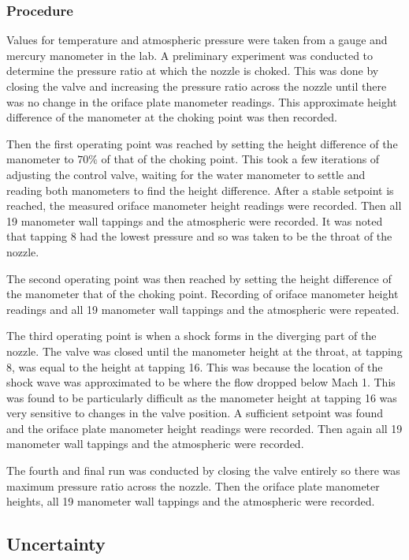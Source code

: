 \documentclass{article}
\begin{document}
\subsubsection{Procedure}

Values for temperature and atmospheric pressure were taken from a gauge and mercury manometer in the lab.
A preliminary experiment was conducted to determine the pressure ratio at which the nozzle is choked.
This was done by closing the valve and increasing the pressure ratio across the nozzle until there was no change in the oriface plate manometer readings.
This approximate height difference of the manometer at the choking point was then recorded.

Then the first operating point was reached by setting the height difference of the manometer to $70\%$ of that of the choking point.
This took a few iterations of adjusting the control valve, waiting for the water manometer to settle and reading both manometers to find the height difference.
After a stable setpoint is reached, the measured oriface manometer height readings were recorded. 
Then all 19 manometer wall tappings and the atmospheric were recorded.
It was noted that tapping 8 had the lowest pressure and so was taken to be the throat of the nozzle.

The second operating point was then reached by setting the height difference of the manometer that of the choking point.
Recording of oriface manometer height readings and all 19 manometer wall tappings and the atmospheric were repeated.

The third operating point is when a shock forms in the diverging part of the nozzle. The valve was closed until the manometer height at the throat, at tapping 8, was equal to the height at tapping 16.
This was because the location of the shock wave was approximated to be where the flow dropped below Mach 1.
This was found to be particularly difficult as the manometer height at tapping 16 was very sensitive to changes in the valve position.
A sufficient setpoint was found and the oriface plate manometer height readings were recorded.
Then again all 19 manometer wall tappings and the atmospheric were recorded.

The fourth and final run was conducted by closing the valve entirely so there was maximum pressure ratio across the nozzle.
Then the oriface plate manometer heights, all 19 manometer wall tappings and the atmospheric were recorded.

\subsection{Uncertainty}
\end{document}
